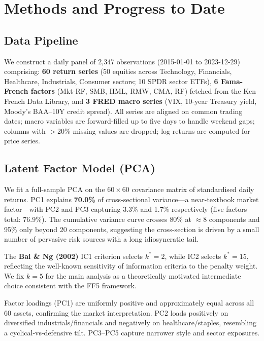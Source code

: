 \documentclass{article}
\begin{document}
\section{Methods and Progress to Date}

\subsection{Data Pipeline}

We construct a daily panel of 2,347 observations (2015-01-01 to 2023-12-29) comprising:
\textbf{60 return series} (50 equities across Technology, Financials, Healthcare, Industrials,
Consumer sectors; 10 SPDR sector ETFs), \textbf{6 Fama-French factors} (Mkt-RF, SMB, HML, RMW, CMA, RF)
fetched from the Ken French Data Library, and \textbf{3 FRED macro series} (VIX, 10-year Treasury
yield, Moody's BAA--10Y credit spread). All series are aligned on common trading dates; macro
variables are forward-filled up to five days to handle weekend gaps; columns with $>$20\% missing
values are dropped; log returns are computed for price series.

\subsection{Latent Factor Model (PCA)}

We fit a full-sample PCA on the $60 \times 60$ covariance matrix of standardised daily returns.
PC1 explains \textbf{70.0\%} of cross-sectional variance---a near-textbook market factor---with PC2
and PC3 capturing 3.3\% and 1.7\% respectively (five factors total: 76.9\%). The cumulative
variance curve crosses 80\% at $\approx$8 components and 95\% only beyond 20 components, suggesting
the cross-section is driven by a small number of pervasive risk sources with a long idiosyncratic
tail.

The \textbf{Bai \& Ng (2002)} IC1 criterion selects $k^*=2$, while IC2 selects $k^*=15$, reflecting
the well-known sensitivity of information criteria to the penalty weight. We fix $k=5$ for the main
analysis as a theoretically motivated intermediate choice consistent with the FF5 framework.

Factor loadings (PC1) are uniformly positive and approximately equal across all 60 assets,
confirming the market interpretation. PC2 loads positively on diversified industrials/financials and
negatively on healthcare/staples, resembling a cyclical-vs-defensive tilt. PC3--PC5 capture
narrower style and sector exposures.
\end{document}
